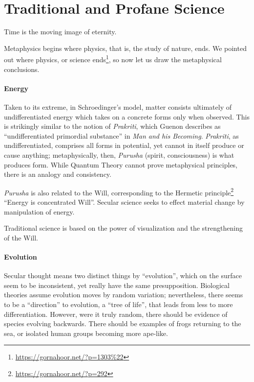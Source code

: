 \section{Traditional and Profane Science}

\begin{quotex}
Time is the moving image of eternity.
\end{quotex}


Metaphysics begins where physics, that is, the study of nature, ends. We pointed out where physics, or science ends\footnote{\url{https://gornahoor.net/?p=1303\%22}}, so now let us draw the metaphysical conclusions.

\paragraph{Energy}

Taken to its extreme, in Schroedinger's model, matter consists ultimately of undifferentiated energy which takes on a concrete forms only when observed. This is strikingly similar to the notion of
\emph{Prakriti}, which Guenon describes as ``undifferentiated primordial substance'' in \emph{Man and his Becoming}. \emph{Prakriti}, as undifferentiated, comprises all forms in potential, yet cannot in itself produce or cause anything; metaphysically, then, \emph{Purusha} (spirit, consciousness) is what produces form. While Quantum Theory cannot prove metaphysical principles, there is an analogy and consistency.

\emph{Purusha} is also related to the Will, corresponding to the Hermetic principle\footnote{\url{https://gornahoor.net/?p=292}} ``Energy is concentrated Will''. Secular science seeks to effect material change by manipulation of energy.

Traditional science is based on the power of visualization and the strengthening of the Will.

\paragraph{Evolution}


Secular thought means two distinct things by ``evolution'', which on the surface seem to be inconsistent, yet really have the same presupposition. Biological theories assume evolution moves by random variation; nevertheless, there seems to be a ``direction'' to evolution, a ``tree of life'', that leads from less to more differentiation. However, were it truly random, there should be evidence of species evolving backwards. There should be examples of frogs returning to the sea, or isolated human groups becoming more ape-like.

